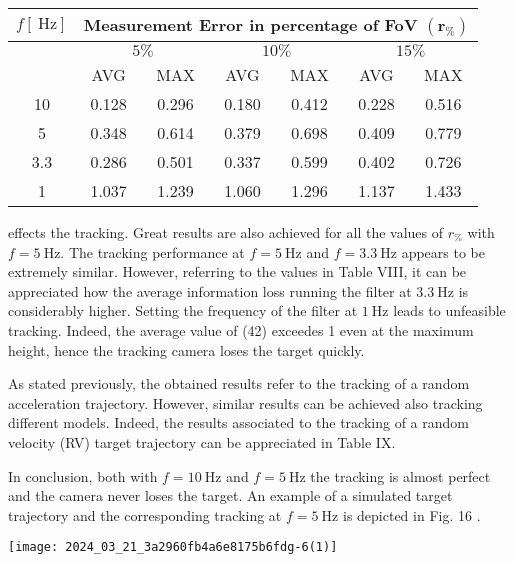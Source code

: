 \documentclass[conference]{IEEEtran}
\begin{document}
\begin{center}
\begin{tabular}{|c|c|c|c|c|c|c|}
\hline
\multirow[b]{3}{*}{$f[\mathrm{~Hz}]$} & \multicolumn{6}{|c|}{Measurement Error in percentage of FoV $\left(\mathbf{r}_{\%}\right)$} \\
\hline
 & \multicolumn{2}{|c|}{$5 \%$} & \multicolumn{2}{|c|}{$10 \%$} & \multicolumn{2}{|c|}{$15 \%$} \\
\hline
 & AVG & MAX & AVG & MAX & AVG & MAX \\
\hline
10 & 0.128 & 0.296 & 0.180 & 0.412 & 0.228 & 0.516 \\
\hline
5 & 0.348 & 0.614 & 0.379 & 0.698 & 0.409 & 0.779 \\
\hline
3.3 & 0.286 & 0.501 & 0.337 & 0.599 & 0.402 & 0.726 \\
\hline
1 & 1.037 & 1.239 & 1.060 & 1.296 & 1.137 & 1.433 \\
\hline
\end{tabular}
\end{center}

effects the tracking. Great results are also achieved for all the values of $r_{\%}$ with $f=5 \mathrm{~Hz}$. The tracking performance at $f=5 \mathrm{~Hz}$ and $f=3.3 \mathrm{~Hz}$ appears to be extremely similar. However, referring to the values in Table VIII, it can be appreciated how the average information loss running the filter at $3.3 \mathrm{~Hz}$ is considerably higher. Setting the frequency of the filter at $1 \mathrm{~Hz}$ leads to unfeasible tracking. Indeed, the average value of (42) exceedes 1 even at the maximum height, hence the tracking camera loses the target quickly.

As stated previously, the obtained results refer to the tracking of a random acceleration trajectory. However, similar results can be achieved also tracking different models. Indeed, the results associated to the tracking of a random velocity (RV) target trajectory can be appreciated in Table IX.

In conclusion, both with $f=10 \mathrm{~Hz}$ and $f=5 \mathrm{~Hz}$ the tracking is almost perfect and the camera never loses the target. An example of a simulated target trajectory and the corresponding tracking at $f=5 \mathrm{~Hz}$ is depicted in Fig. 16 .

\begin{center}
\texttt{[image: 2024\_03\_21\_3a2960fb4a6e8175b6fdg-6(1)]}
\end{center}
\end{document}
